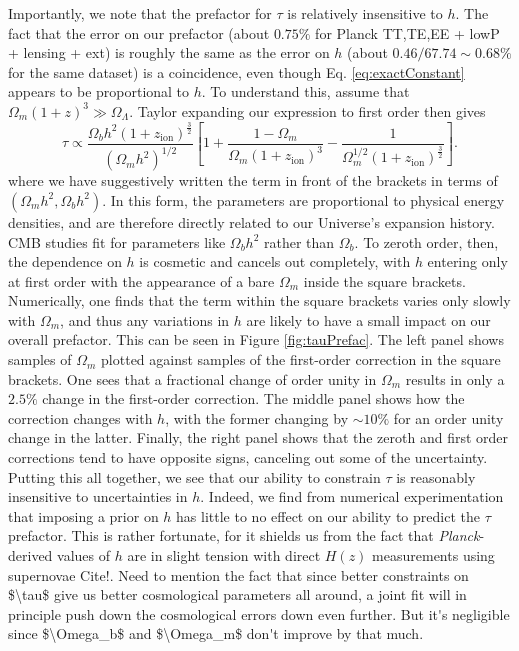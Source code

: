 \documentclass[twocolumn,aps,prd,nofootinbib,showpacs]{revtex4-1}
\begin{document}
Importantly, we note that the prefactor for $\tau$ is relatively insensitive to $h$. The fact that the error on our prefactor (about $0.75\%$ for Planck TT,TE,EE + lowP + lensing + ext) is roughly the same as the error on $h$ (about $0.46 / 67.74 \sim 0.68\%$ for the same dataset) is a coincidence, even though Eq. \eqref{eq:exactConstant} appears to be proportional to $h$. To understand this, assume that $\Omega_m (1+z)^3 \gg \Omega_\Lambda$. Taylor expanding our expression to first order then gives
\begin{equation}
\tau \propto \frac{\Omega_b h^2 (1+z_\textrm{ion})^\frac{3}{2}}{(\Omega_m h^2)^{1/2}} \left[ 1 + \frac{1-\Omega_m}{\Omega_m (1+z_\textrm{ion})^3}- \frac{1}{\Omega_m^{1/2} (1+z_\textrm{ion})^\frac{3}{2}}\right].
\end{equation}
where we have suggestively written the term in front of the brackets in terms of $(\Omega_m h^2,\Omega_b h^2)$. In this form, the parameters are proportional to physical energy densities, and are therefore directly related to our Universe's expansion history. CMB studies fit for  parameters like $\Omega_b h^2$ rather than $\Omega_b$. To zeroth order, then, the dependence on $h$ is cosmetic and cancels out completely, with $h$ entering only at first order with the appearance of a bare $\Omega_m$ inside the square brackets. Numerically, one finds that the term within the square brackets varies only slowly with $\Omega_m$, and thus any variations in $h$ are likely to have a small impact on our overall prefactor. This can be seen in Figure \ref{fig:tauPrefac}. The left panel shows samples of $\Omega_m$ plotted against samples of the first-order correction in the square brackets. One sees that a fractional change of order unity in $\Omega_m$ results in only a $2.5\%$ change in the first-order correction. The middle panel shows how the correction changes with $h$, with the former changing by $\sim 10\%$ for an order unity change in the latter. Finally, the right panel shows that the zeroth and first order corrections tend to have opposite signs, canceling out some of the uncertainty. Putting this all together, we see that our ability to constrain $\tau$ is reasonably insensitive to uncertainties in $h$. Indeed, we find from numerical experimentation that imposing a prior on $h$ has little to no effect on our ability to predict the $\tau$ prefactor. This is rather fortunate, for it shields us from the fact that \emph{Planck}-derived values of $h$ are in slight tension with direct $H(z)$ measurements using supernovae \acl{Cite!}. \acl{Need to mention the fact that since better constraints on $\tau$ give us better cosmological parameters all around, a joint fit will in principle push down the cosmological errors down even further. But it's negligible since $\Omega_b$ and $\Omega_m$ don't improve by that much.}
\end{document}
